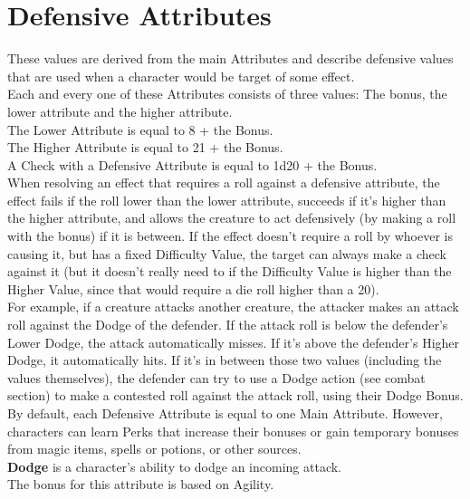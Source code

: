 \section{Defensive Attributes}\label{sec:defensiveStats}
These values are derived from the main Attributes and describe defensive values that are used when a character would be target of some effect.\\
Each and every one of these Attributes consists of three values: The bonus, the lower attribute and the higher attribute.\\
The Lower Attribute is equal to 8 + the Bonus.\\
The Higher Attribute is equal to 21 + the Bonus.\\
A Check with a Defensive Attribute is equal to 1d20 + the Bonus.\\
When resolving an effect that requires a roll against a defensive attribute, the effect fails if the roll lower than the lower attribute, succeeds if it's higher than the higher attribute, and allows the creature to act defensively (by making a roll with the bonus) if it is between.
If the effect doesn't require a roll by whoever is causing it, but has a fixed Difficulty Value, the target can always make a check against it (but it doesn't really need to if the Difficulty Value is higher than the Higher Value, since that would require a die roll higher than a 20).\\

For example, if a creature attacks another creature, the attacker makes an attack roll against the Dodge of the defender.
If the attack roll is below the defender's Lower Dodge, the attack automatically misses.
If it's above the defender's Higher Dodge, it automatically hits.
If it's in between those two values (including the values themselves), the defender can try to use a Dodge action (see combat section) to make a contested roll against the attack roll, using their Dodge Bonus.\\

By default, each Defensive Attribute is equal to one Main Attribute.
However, characters can learn Perks that increase their bonuses or gain temporary bonuses from magic items, spells or potions, or other sources.\\


\textbf{Dodge}\label{stat:dodge} is a character's ability to dodge an incoming attack.\\
The bonus for this attribute is based on Agility.\\

